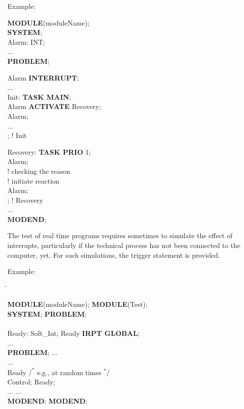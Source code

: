 Example:

{\bf MODULE}(moduleName);\\
{\bf SYSTEM};\\
\x Alarm: INT;\\
\x ...\\
{\bf PROBLEM};

 Alarm {\bf INTERRUPT};\\
\x ...\\
\x Init: {\bf TASK MAIN};\\
\x {} Alarm {\bf ACTIVATE} Recovery;\\
\x {} Alarm;\\
\x \x ... \\
\x {}; ! Init

\x Recovery: {\bf TASK PRIO} 1;\\
\x {} Alarm;\\
\x \x \x ! checking the reason\\
\x \x \x ! initiate reaction\\
\x {} Alarm;\\
\x {}; ! Recovery\\
\x ...\\
{\bf MODEND};

The test of real time programs requires sometimes to simulate the effect
of interrupts, particularly if the technical process has not been
connected to the computer, yet. For such simulations, the trigger
statement is provided.


Example:

\begin{tabbing}
\hspace{6cm} \= \kill

{\bf MODULE}(moduleName);     \> {\bf MODULE}(Test);\\
{\bf SYSTEM};                 \> {\bf PROBLEM};\\
         \> \\
\x Ready: Soft\_Int;          \>  Ready {\bf IRPT GLOBAL};\\
\x ...                        \> \\
{\bf PROBLEM};                \> \x ...\\
\x ...                        \> \\
 Ready           \> \x $/^*$ e.g., at random times $^*/$ \\
\x {} Control; \>  Ready;\\
\x ...                        \> \x ...\\
{\bf MODEND};                 \> {\bf MODEND};
\end{tabbing}

